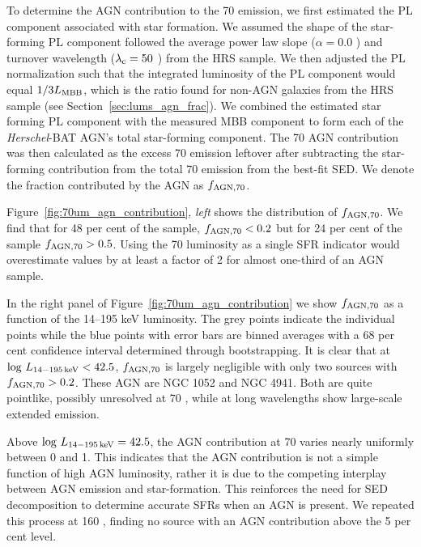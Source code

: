 \documentclass[fleqn, usenatbib]{mnras}
\newcommand{\herschel}{\emph{Herschel}}
\begin{document}
To determine the AGN contribution to the 70 \micron{} emission, we first estimated the PL component associated with star formation. We assumed the shape of the star-forming PL component followed the average power law slope ($\alpha=0.0$ ) and turnover wavelength ($\lambda_{\rm c} = 50$ \micron) from the HRS sample. We then adjusted the PL normalization such that the integrated luminosity of the PL component would equal $1/3L_{\rm MBB}$, which is the ratio found for non-AGN galaxies from the HRS sample (see Section~\ref{sec:lums_agn_frac}). We combined the estimated star forming PL component with the measured MBB component to form each of the \herschel-BAT AGN's total star-forming component. The 70 \micron{} AGN contribution was then calculated as the excess 70 \micron{} emission leftover after subtracting the star-forming contribution from the total 70 \micron{} emission from the best-fit SED. We denote the fraction contributed by the AGN as $f_{\rm AGN, 70}$.

Figure~\ref{fig:70um_agn_contribution}, \textit{left} shows the distribution of $f_{\rm AGN, 70}$. We find that for 48 per cent of the sample,  $f_{\rm AGN, 70} < 0.2$ but for 24 per cent of the sample $f_{\rm AGN, 70} > 0.5$. Using the 70 \micron{} luminosity as a single SFR indicator would overestimate values by at least a factor of 2 for almost one-third of an AGN sample. 

In the right panel of Figure~\ref{fig:70um_agn_contribution} we show $f_{\rm AGN, 70}$ as a function of the 14--195 keV luminosity. The grey points indicate the individual points while the blue points with error bars are binned averages with a 68 per cent confidence interval determined through bootstrapping. It is clear that at $\log\,L_{\rm 14-195\,keV} < 42.5$, $f_{\rm AGN, 70}$ is largely negligible with only two sources with $f_{\rm AGN, 70} > 0.2$. These AGN are NGC 1052 and NGC 4941. Both are quite pointlike, possibly unresolved at 70 \micron, while at long wavelengths show large-scale extended emission.

Above $\log\,L_{\rm 14-195\,keV} = 42.5$, the AGN contribution at 70 \micron{} varies nearly uniformly between 0 and 1. This indicates that the AGN contribution is not a simple function of high AGN luminosity, rather it is due to the competing interplay between AGN emission and star-formation. This reinforces the need for SED decomposition to determine accurate SFRs when an AGN is present. We repeated this process at 160 \micron, finding no source with an AGN contribution above the 5 per cent level.
\end{document}
